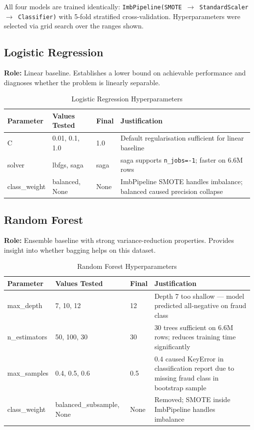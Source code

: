 \documentclass[12pt,a4paper]{article}
\begin{document}
All four models are trained identically: \texttt{ImbPipeline(SMOTE $\to$ StandardScaler $\to$ Classifier)} with 5-fold stratified cross-validation. Hyperparameters were selected via grid search over the ranges shown.

\subsection{Logistic Regression}

\textbf{Role:} Linear baseline. Establishes a lower bound on achievable performance and diagnoses whether the problem is linearly separable.

\begin{table}[H]
\centering
\caption{Logistic Regression Hyperparameters}
\label{tab:hp_lr}
\small
\setlength{\tabcolsep}{5pt}
\begin{tabular}{p{2.8cm}p{3.2cm}p{1.8cm}p{6.0cm}}
\toprule
\textbf{Parameter} & \textbf{Values Tested} & \textbf{Final} & \textbf{Justification} \\
\midrule
C & 0.01, 0.1, 1.0 & 1.0 & Default regularisation sufficient for linear baseline \\
solver & lbfgs, saga & saga & saga supports \texttt{n\_jobs=-1}; faster on 6.6M rows \\
class\_weight & balanced, None & None & ImbPipeline SMOTE handles imbalance; balanced caused precision collapse \\
\bottomrule
\end{tabular}
\end{table}

\subsection{Random Forest}

\textbf{Role:} Ensemble baseline with strong variance-reduction properties. Provides insight into whether bagging helps on this dataset.

\begin{table}[H]
\centering
\caption{Random Forest Hyperparameters}
\label{tab:hp_rf}
\small
\setlength{\tabcolsep}{5pt}
\begin{tabular}{p{2.8cm}p{3.2cm}p{1.8cm}p{6.0cm}}
\toprule
\textbf{Parameter} & \textbf{Values Tested} & \textbf{Final} & \textbf{Justification} \\
\midrule
max\_depth & 7, 10, 12 & 12 & Depth 7 too shallow --- model predicted all-negative on fraud class \\
n\_estimators & 50, 100, 30 & 30 & 30 trees sufficient on 6.6M rows; reduces training time significantly \\
max\_samples & 0.4, 0.5, 0.6 & 0.5 & 0.4 caused KeyError in classification report due to missing fraud class in bootstrap sample \\
class\_weight & balanced\_subsample, None & None & Removed; SMOTE inside ImbPipeline handles imbalance \\
\bottomrule
\end{tabular}
\end{table}
\end{document}
